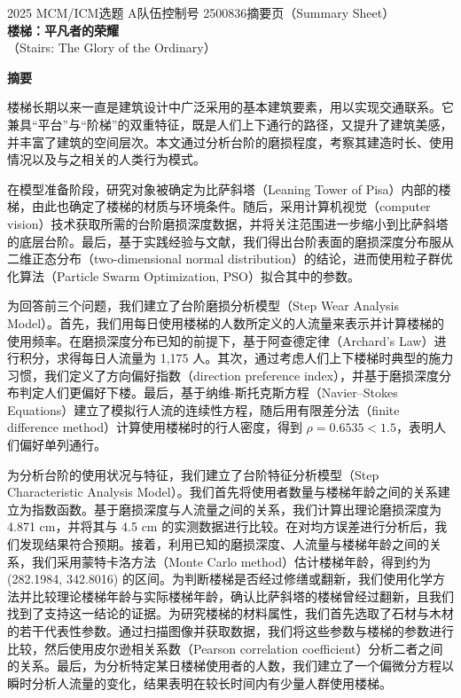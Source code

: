\documentclass[11pt,a4paper]{ctexart}
\begin{document}
\thispagestyle{empty}
\begin{center}
{\small 2025 MCM/ICM\quad 选题 A\quad 队伍控制号 2500836\quad 摘要页（Summary Sheet）}\\[18pt]
{\LARGE\bfseries 楼梯：平凡者的荣耀}\\[8pt]
{\large （Stairs: The Glory of the Ordinary）}\\[10pt]
\end{center}

\begin{center}
{\large\bfseries 摘\quad 要}
\end{center}

楼梯长期以来一直是建筑设计中广泛采用的基本建筑要素，用以实现交通联系。它兼具“平台”与“阶梯”的双重特征，既是人们上下通行的路径，又提升了建筑美感，并丰富了建筑的空间层次。本文通过分析台阶的磨损程度，考察其建造时长、使用情况以及与之相关的人类行为模式。

在模型准备阶段，研究对象被确定为比萨斜塔（Leaning Tower of Pisa）内部的楼梯，由此也确定了楼梯的材质与环境条件。随后，采用计算机视觉（computer vision）技术获取所需的台阶磨损深度数据，并将关注范围进一步缩小到比萨斜塔的底层台阶。最后，基于实践经验与文献，我们得出台阶表面的磨损深度分布服从二维正态分布（two-dimensional normal distribution）的结论，进而使用粒子群优化算法（Particle Swarm Optimization, PSO）拟合其中的参数。

为回答前三个问题，我们建立了台阶磨损分析模型（Step Wear Analysis Model）。首先，我们用每日使用楼梯的人数所定义的人流量来表示并计算楼梯的使用频率。在磨损深度分布已知的前提下，基于阿查德定律（Archard's Law）进行积分，求得每日人流量为 1,175 人。其次，通过考虑人们上下楼梯时典型的施力习惯，我们定义了方向偏好指数（direction preference index），并基于磨损深度分布判定人们更偏好下楼。最后，基于纳维-斯托克斯方程（Navier--Stokes Equations）建立了模拟行人流的连续性方程，随后用有限差分法（finite difference method）计算使用楼梯时的行人密度，得到 $\rho=0.6535<1.5$，表明人们偏好单列通行。

为分析台阶的使用状况与特征，我们建立了台阶特征分析模型（Step Characteristic Analysis Model）。我们首先将使用者数量与楼梯年龄之间的关系建立为指数函数。基于磨损深度与人流量之间的关系，我们计算出理论磨损深度为 4.871 cm，并将其与 4.5 cm 的实测数据进行比较。在对均方误差进行分析后，我们发现结果符合预期。接着，利用已知的磨损深度、人流量与楼梯年龄之间的关系，我们采用蒙特卡洛方法（Monte Carlo method）估计楼梯年龄，得到约为 (282.1984, 342.8016) 的区间。为判断楼梯是否经过修缮或翻新，我们使用化学方法并比较理论楼梯年龄与实际楼梯年龄，确认比萨斜塔的楼梯曾经过翻新，且我们找到了支持这一结论的证据。为研究楼梯的材料属性，我们首先选取了石材与木材的若干代表性参数。通过扫描图像并获取数据，我们将这些参数与楼梯的参数进行比较，然后使用皮尔逊相关系数（Pearson correlation coefficient）分析二者之间的关系。最后，为分析特定某日楼梯使用者的人数，我们建立了一个偏微分方程以瞬时分析人流量的变化，结果表明在较长时间内有少量人群使用楼梯。
\end{document}
